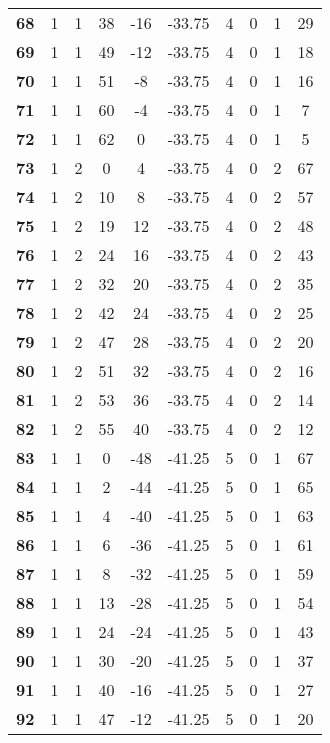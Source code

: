 \documentclass{article}%
\begin{document}
\begin{longtable}{cccccccccc}
        \textbf{68} & 1 & 1 & 38 & -16 & -33.75 & 4 & 0 & 1 & 29 \\ 
        \textbf{69} & 1 & 1 & 49 & -12 & -33.75 & 4 & 0 & 1 & 18 \\ 
        \textbf{70} & 1 & 1 & 51 & -8 & -33.75 & 4 & 0 & 1 & 16 \\ 
        \textbf{71} & 1 & 1 & 60 & -4 & -33.75 & 4 & 0 & 1 & 7 \\ 
        \textbf{72} & 1 & 1 & 62 & 0 & -33.75 & 4 & 0 & 1 & 5 \\ 
        \textbf{73} & 1 & 2 & 0 & 4 & -33.75 & 4 & 0 & 2 & 67 \\ 
        \textbf{74} & 1 & 2 & 10 & 8 & -33.75 & 4 & 0 & 2 & 57 \\ 
        \textbf{75} & 1 & 2 & 19 & 12 & -33.75 & 4 & 0 & 2 & 48 \\ 
        \textbf{76} & 1 & 2 & 24 & 16 & -33.75 & 4 & 0 & 2 & 43 \\ 
        \textbf{77} & 1 & 2 & 32 & 20 & -33.75 & 4 & 0 & 2 & 35 \\ 
        \textbf{78} & 1 & 2 & 42 & 24 & -33.75 & 4 & 0 & 2 & 25 \\ 
        \textbf{79} & 1 & 2 & 47 & 28 & -33.75 & 4 & 0 & 2 & 20 \\ 
        \textbf{80} & 1 & 2 & 51 & 32 & -33.75 & 4 & 0 & 2 & 16 \\ 
        \textbf{81} & 1 & 2 & 53 & 36 & -33.75 & 4 & 0 & 2 & 14 \\ 
        \textbf{82} & 1 & 2 & 55 & 40 & -33.75 & 4 & 0 & 2 & 12 \\ 
        \textbf{83} & 1 & 1 & 0 & -48 & -41.25 & 5 & 0 & 1 & 67 \\ 
        \textbf{84} & 1 & 1 & 2 & -44 & -41.25 & 5 & 0 & 1 & 65 \\ 
        \textbf{85} & 1 & 1 & 4 & -40 & -41.25 & 5 & 0 & 1 & 63 \\ 
        \textbf{86} & 1 & 1 & 6 & -36 & -41.25 & 5 & 0 & 1 & 61 \\ 
        \textbf{87} & 1 & 1 & 8 & -32 & -41.25 & 5 & 0 & 1 & 59 \\ 
        \textbf{88} & 1 & 1 & 13 & -28 & -41.25 & 5 & 0 & 1 & 54 \\ 
        \textbf{89} & 1 & 1 & 24 & -24 & -41.25 & 5 & 0 & 1 & 43 \\ 
        \textbf{90} & 1 & 1 & 30 & -20 & -41.25 & 5 & 0 & 1 & 37 \\ 
        \textbf{91} & 1 & 1 & 40 & -16 & -41.25 & 5 & 0 & 1 & 27 \\ 
        \textbf{92} & 1 & 1 & 47 & -12 & -41.25 & 5 & 0 & 1 & 20 \\ 

\end{longtable}
\end{document}
